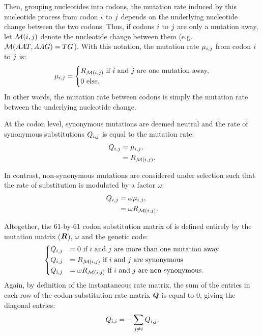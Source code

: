 Then, grouping nucleotides into codons, the mutation rate induced by this nucleotide process from codon ${i}$ to ${j}$ depends on the underlying nucleotide change between the two codons.
Thus, if codons ${i}$ to ${j}$ are only a mutation away, let $\mathcal{M}({i}, {j})$ denote the nucleotide change between them (e.g. $\mathcal{M}(AAT, AAG) = TG$).
With this notation, the mutation rate $\mu_{{i}, {j}}$ from codon ${i}$ to ${j}$ is:
\begin{equation}
    \mu_{{i}, {j}} =
    \begin{dcases}
        R_{\mathcal{M}({i}, {j})} \text{ if ${i}$ and ${j}$ are one mutation away,} \\
        0 \text{ else.}
    \end{dcases}
\end{equation}
In other words, the mutation rate between codons is simply the mutation rate between the underlying nucleotide change.

At the codon level, synonymous mutations are deemed neutral and the rate of synonymous substitutions ${Q_{{i}, {j}}}$ is equal to the mutation rate:
\begin{align}
    Q_{{i}, {j}} & = \mu_{{i}, {j}}, \\
    & = R_{\mathcal{M}({i}, {j})}.
\end{align}

In contrast, non-synonymous mutations are considered under selection such that the rate of substitution is modulated by a factor $\omega$:
\begin{align}
    Q_{{i}, {j}} & = \omega \mu_{{i}, {j}}, \\
    & = \omega R_{\mathcal{M}({i}, {j})}.
\end{align}

Altogether, the $61$-by-$61$ codon substitution matrix of \citet{Muse1994} is defined entirely by the mutation matrix ($\bm{R}$), $\omega$ and the genetic code:
\begin{equation}
    \begin{dcases}
        Q_{{i}, {j}} & = 0 \text{ if ${i}$ and ${j}$ are more than one mutation away} \\
        Q_{{i}, {j}} & = R_{\mathcal{M}({i}, {j})} \text{ if ${i}$ and ${j}$ are synonymous} \\
        Q_{{i}, {j}} & = \omega R_{\mathcal{M}({i}, {j})} \text{ if ${i}$ and ${j}$ are non-synonymous}.
    \end{dcases}
    \label{eq:codon-models}
\end{equation}
Again, by definition of the instantaneous rate matrix, the sum of the entries in each row of the codon substitution rate matrix $\bm{Q}$ is equal to $0$, giving the diagonal entries:
\begin{equation}
    Q_{{i}, {i}} = - \sum\limits_{{j} \neq {i}} Q_{{i}, {j}}.
\end{equation}

